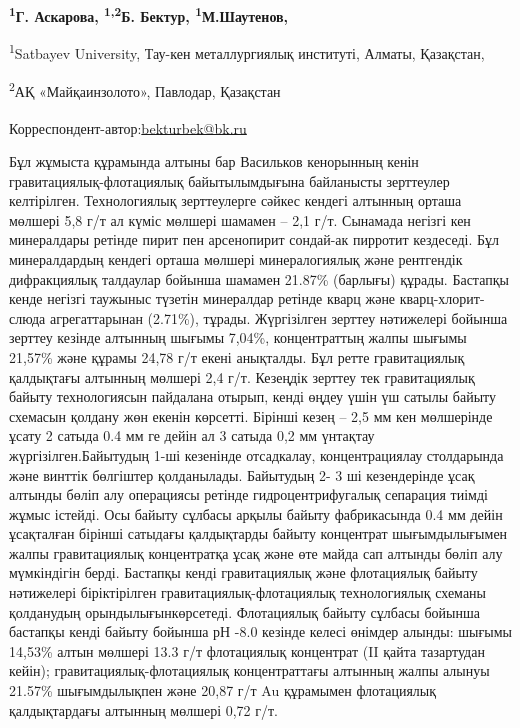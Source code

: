 
\begin{articleheader}

{\bfseries \textsuperscript{1}Г. Аскарова, \textsuperscript{1,2}Б.
Бектур\textsuperscript{\envelope }, \textsuperscript{1}М.Шаутенов,
}
\end{articleheader}
\begin{affiliation}

\textsuperscript{1}Satbayev University, Тау-кен металлургиялық
институті, Алматы, Қазақстан,

\textsuperscript{2}АҚ «Майқаинзолото», Павлодар, Қазақстан

\raggedright{\bfseries \textsuperscript{\envelope }}Корреспондент-автор:\href{mailto:bekturbek@bk.run}{bekturbek@bk.ru}
\end{affiliation}

Бұл жұмыста құрамында алтыны бар Васильков кенорынның кенін
гравитациялық-флотациялық байытылымдығына байланысты зерттеулер
келтірілген. Технологиялық зерттеулерге сәйкес кендегі алтынның орташа
мөлшері 5,8 г/т ал күміс мөлшері шамамен -- 2,1 г/т. Сынамада негізгі
кен минералдары ретінде пирит пен арсенопирит сондай-ак пирротит
кездеседі. Бұл минералдардың кендегі орташа мөлшері минералогиялық және
рентгендік дифракциялық талдаулар бойынша шамамен 21.87\% (барлығы)
құрады. Бастапқы кенде негізгі таужыныс түзетін минералдар ретінде кварц
және кварц-хлорит-слюда агрегаттарынан (2.71\%), тұрады. Жүргізілген
зерттеу нәтижелері бойынша зерттеу кезінде алтынның шығымы 7,04\%,
концентраттың жалпы шығымы 21,57\% және құрамы 24,78 г/т екені
анықталды. Бұл ретте гравитациялық қалдықтағы алтынның мөлшері 2,4 г/т.
Кезеңдік зерттеу тек гравитациялық байыту технологиясын пайдалана
отырып, кенді өңдеу үшін үш сатылы байыту схемасын қолдану жөн екенін
көрсетті. Бірінші кезең -- 2,5 мм кен мөлшерінде ұсату 2 сатыда 0.4 мм
ге дейін ал 3 сатыда 0,2 мм үнтақтау жүргізілген.Байытудың 1-ші
кезенінде отсадкалау, концентрациялау столдарында және винттік бөлгіштер
қолданылады. Байытудың 2- 3 ші кезендерінде ұсақ алтынды бөліп алу
операциясы ретінде гидроцентрифугалық сепарация тиімді жұмыс істейді.
Осы байыту сұлбасы арқылы байыту фабрикасында 0.4 мм дейін ұсақталған
бірінші сатыдағы қалдықтарды байыту концентрат шығымдылығымен жалпы
гравитациялық концентратқа ұсақ және өте майда сап алтынды бөліп алу
мүмкіндігін берді. Бастапқы кенді гравитациялық және флотациялық байыту
нәтижелері біріктірілген гравитациялық-флотациялық технологиялық схеманы
қолданудың орындылығынкөрсетеді. Флотациялық байыту сұлбасы бойынша
бастапқы кенді байыту бойынша рН -8.0 кезінде келесі өнімдер алынды:
шығымы 14,53\% алтын мөлшері 13.3 г/т флотациялық концентрат (II қайта тазартудан кейін);
гравитациялық-флотациялық концентраттағы алтынның жалпы алынуы 21.57\%
шығымдылықпен және 20,87 г/т Au құрамымен флотациялық қалдықтардағы
алтынның мөлшері 0,72 г/т.

